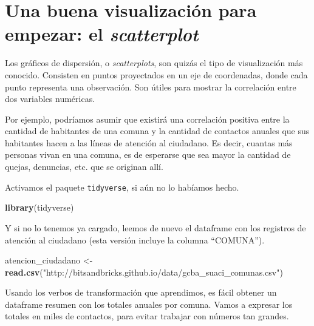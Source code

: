 \documentclass[spanish,]{book}
\newenvironment{Shaded}{\begin{snugshade}}{\end{snugshade}}
\newcommand{\DataTypeTok}[1]{\textcolor[rgb]{0.13,0.29,0.53}{#1}}
\newcommand{\DecValTok}[1]{\textcolor[rgb]{0.00,0.00,0.81}{#1}}
\newcommand{\KeywordTok}[1]{\textcolor[rgb]{0.13,0.29,0.53}{\textbf{#1}}}
\newcommand{\NormalTok}[1]{#1}
\newcommand{\OperatorTok}[1]{\textcolor[rgb]{0.81,0.36,0.00}{\textbf{#1}}}
\newcommand{\StringTok}[1]{\textcolor[rgb]{0.31,0.60,0.02}{#1}}
\begin{document}
\hypertarget{una-buena-visualizaciuxf3n-para-empezar-el-scatterplot}{%
\section{\texorpdfstring{Una buena visualización para empezar: el \emph{scatterplot}}{Una buena visualización para empezar: el scatterplot}}\label{una-buena-visualizaciuxf3n-para-empezar-el-scatterplot}}

Los gráficos de dispersión, o \emph{scatterplots}, son quizás el tipo de visualización más conocido. Consisten en puntos proyectados en un eje de coordenadas, donde cada punto representa una observación. Son útiles para mostrar la correlación entre dos variables numéricas.

Por ejemplo, podríamos asumir que existirá una correlación positiva entre la cantidad de habitantes de una comuna y la cantidad de contactos anuales que sus habitantes hacen a las líneas de atención al ciudadano. Es decir, cuantas más personas vivan en una comuna, es de esperarse que sea mayor la cantidad de quejas, denuncias, etc. que se originan allí.

Activamos el paquete \texttt{tidyverse}, si aún no lo habíamos hecho.

\begin{Shaded}
\begin{Highlighting}[]
\KeywordTok{library}\NormalTok{(tidyverse)}
\end{Highlighting}
\end{Shaded}

Y si no lo tenemos ya cargado, leemos de nuevo el dataframe con los registros de atención al ciudadano (esta versión incluye la columna ``COMUNA'').

\begin{Shaded}
\begin{Highlighting}[]
\NormalTok{atencion_ciudadano <-}\StringTok{ }\KeywordTok{read.csv}\NormalTok{(}\StringTok{"http://bitsandbricks.github.io/data/gcba_suaci_comunas.csv"}\NormalTok{)}
\end{Highlighting}
\end{Shaded}

Usando los verbos de transformación que aprendimos, es fácil obtener un dataframe resumen con los totales anuales por comuna. Vamos a expresar los totales en miles de contactos, para evitar trabajar con números tan grandes.

\begin{Shaded}
\end{Shaded}
\end{document}
